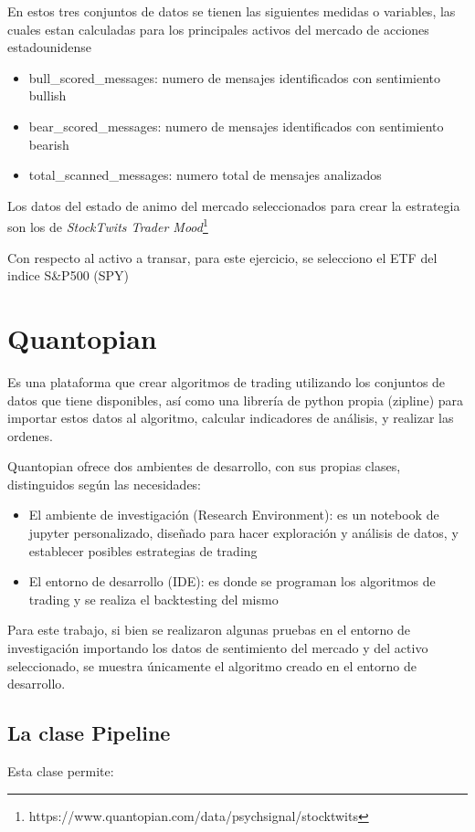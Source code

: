 \documentclass[a4paper, 11pt, twocolumn]{article}
\begin{document}
En estos tres conjuntos de datos se tienen las siguientes medidas o variables, las cuales estan calculadas para los principales activos del mercado de acciones estadounidense
\begin{itemize}
    \item bull\_scored\_messages: numero de mensajes identificados con sentimiento bullish
    \item bear\_scored\_messages: numero de mensajes identificados con sentimiento bearish
    \item total\_scanned\_messages: numero total de mensajes analizados
\end{itemize}

Los datos del estado de animo del mercado seleccionados para crear la estrategia son los de \textit{StockTwits Trader Mood}\footnote{https://www.quantopian.com/data/psychsignal/stocktwits}

Con respecto al activo a transar, para este ejercicio, se selecciono el ETF del indice S&P500 (SPY)

\section{Quantopian}
Es una plataforma que crear algoritmos de trading utilizando los conjuntos de datos que tiene disponibles, así como una librería de python propia (zipline) para importar estos datos al algoritmo, calcular indicadores de análisis, y realizar las ordenes.

Quantopian ofrece dos ambientes de desarrollo, con sus propias clases, distinguidos según las necesidades:
\begin{itemize}
    \item El ambiente de investigación (Research Environment): es un notebook de jupyter personalizado, diseñado para hacer exploración y análisis de datos, y establecer posibles estrategias de trading
    \item El entorno de desarrollo (IDE): es donde se programan los algoritmos de trading y se realiza el backtesting del mismo
\end{itemize}

Para este trabajo, si bien se realizaron algunas pruebas en el entorno de investigación importando los datos de sentimiento del mercado y del activo seleccionado, se muestra únicamente el algoritmo creado en el entorno de desarrollo.

\subsection{La clase Pipeline}
Esta clase permite:
\end{document}
